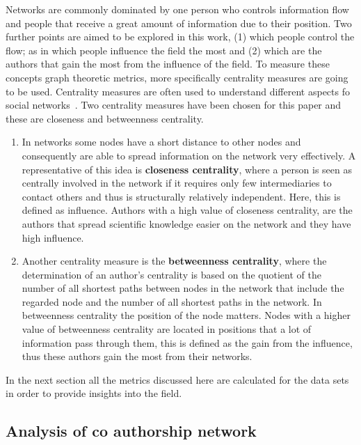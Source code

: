 \documentclass{article}
\theoremstyle{definition}
\begin{document}
Networks are commonly dominated by one person who controls information flow and
people that receive a great amount of information due to their position.
Two further points are aimed to be explored in this work, (1) which people control the flow;
as in which people influence the field the most and (2) which are the authors that
gain the most from the influence of the field. To measure these concepts graph
theoretic metrics, more specifically centrality measures are going to be used.
Centrality measures are often used to understand different
aspects fo social networks~\cite{Landherr2010}. Two centrality measures have been
chosen for this paper and these are closeness and betweenness centrality.

\begin{enumerate}
    \item In networks some nodes have a short distance to other nodes and consequently
    are able to spread information on the network very effectively.
    A representative of this idea is \textbf{closeness centrality}, where a person is seen
    as centrally involved in the network if it requires only few intermediaries
    to contact others and thus is structurally relatively independent. Here,
    this is defined as influence. Authors with a high value of closeness centrality,
    are the authors that spread scientific knowledge easier on the network
    and they have high influence.
    \item Another centrality measure is the \textbf{betweenness centrality},
    where the determination of an author's centrality is based on the quotient of
    the number of all shortest paths between nodes in the network that include
    the regarded node and the number of all shortest paths in the network.
    In betweenness centrality the position of the node matters. Nodes
    with a higher value of betweenness centrality are located in positions that
    a lot of information pass through them, this is defined as the gain from
    the influence, thus these authors gain the most from their networks.
\end{enumerate}

In the next section all the metrics discussed here are calculated for the data
sets in order to provide insights into the field.

\subsection{Analysis of co authorship network}\label{section:results}
\end{document}
